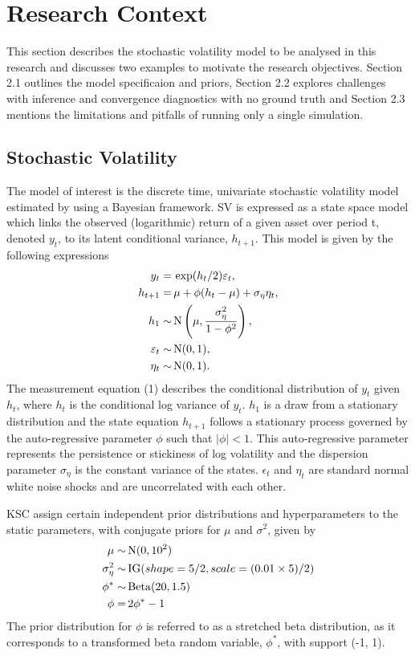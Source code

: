 \documentclass[12pt, a4paper]{article}
\begin{document}
\section{Research Context}
This section describes the stochastic volatility model to be analysed in this research and discusses two examples to motivate the research objectives. Section 2.1 outlines the model specificaion and priors, Section 2.2 explores challenges with inference and convergence diagnostics with no ground truth and Section 2.3 mentions the limitations and pitfalls of running only a single simulation.

\subsection{Stochastic Volatility}
    The model of interest is the discrete time, univariate stochastic volatility model estimated by \citet{kim1998stochastic} using a Bayesian framework. SV is expressed as a state space model which links the observed (logarithmic) return of a given asset over period t, denoted $y_t$, to its latent conditional variance, $h_{t+1}$. This model is given by the following expressions
    \begin{align}
    y_t =& \space \,\exp(h_t/2) \varepsilon_t, \\
    h_{t+1} =& \space \, \mu +\phi(h_t - \mu) + \sigma_{\eta} \eta_t,  \\
    h_1 \sim& \space \,\mathrm{N}\left(\mu, \frac{\sigma_{\eta}^2}{1-\phi^2}\right), \\
    \varepsilon_t \sim& \space \,\mathrm{N}(0,1), \\
    \eta_t \sim& \space \,\mathrm{N}(0,1).
    \end{align}
    The measurement equation (1) describes the conditional distribution of $y_t$ given $h_t$, where $h_t$ is the conditional log variance of $y_t$. $h_1$ is a draw from a stationary distribution and the state equation $h_{t+1}$ follows a stationary process governed by the auto-regressive parameter $\phi$ such that $|\phi|<1$. This auto-regressive parameter represents the persistence or stickiness of log volatility and the dispersion parameter $\sigma_{\eta}$ is the constant variance of the states. $\epsilon_t$ and $\eta_t$ are standard normal white noise shocks and are uncorrelated with each other.

    KSC assign certain independent prior distributions and hyperparameters to the static parameters, with conjugate priors for $\mu$ and $\sigma^2$, given by
    \begin{align}
    \mu \sim& \space \,\mathrm{N}(0, 10^2) \\
    \sigma_{\eta}^2 \sim& \space \, \mathrm{IG}(shape=5/2, scale=(0.01\times 5) / 2) \\
    \phi^{\ast} \sim& \space \,\mathrm{Beta}(20, 1.5) \\
    \phi =& \space \, 2\phi^{\ast} - 1
    \end{align}
    The prior distribution for $\phi$ is referred to as a stretched beta distribution, as it corresponds to a transformed beta random variable, $\phi^*$, with support (-1, 1).
    
\end{document}
